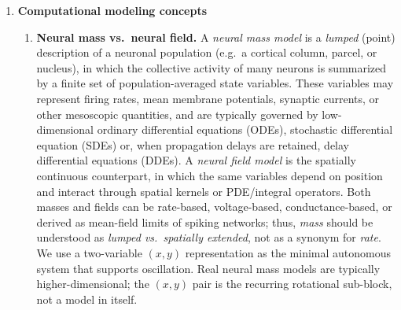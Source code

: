 \documentclass[12pt]{article}
\numberwithin{equation}{section}
\newcommand{\rev}[1]{\begingroup\color{blue}#1\endgroup}
\begin{document}
\begin{enumerate}
\item \textbf{Computational modeling concepts} 
\begin{enumerate} 
\item  \rev{\textbf{Neural mass vs.\ neural field.}
A \emph{neural mass model} is a \emph{lumped} (point) description of a neuronal
population (e.g.\ a cortical column, parcel, or nucleus), in which the collective activity
of many neurons is summarized by a finite set of population-averaged state variables.
These variables may represent firing rates, mean membrane potentials, synaptic currents,
or other mesoscopic quantities, and are typically governed by low-dimensional ordinary differential equations (ODEs), stochastic differential equation (SDEs) or,
when propagation delays are retained,  delay differential equations (DDEs).
A \emph{neural field model} is the spatially continuous counterpart, in which the same
variables depend on position and interact through spatial kernels or PDE/integral operators.
Both masses and fields can be rate-based, voltage-based, conductance-based, or derived
as mean-field limits of spiking networks; thus, \emph{mass} should be understood as
\emph{lumped vs.\ spatially extended}, not as a synonym for \emph{rate}.
\smallskip
We use a two-variable $(x,y)$ representation as the minimal autonomous system that supports oscillation. Real neural mass models are typically higher-dimensional; the $(x,y)$ pair is the recurring rotational sub-block, not a model in itself.}


\end{enumerate}
\end{enumerate}
\end{document}
